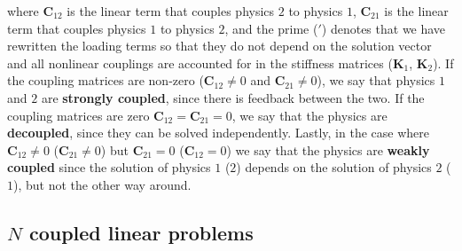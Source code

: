     where $\mathbf{C}_{12}$ is the linear term that couples physics $2$ to physics $1$,
$\mathbf{C}_{21}$ is the linear term that couples physics $1$ to physics $2$, and the
    prime ($\prime$) denotes that we have rewritten the loading terms so that they do not
    depend on the solution vector and all nonlinear couplings are
    accounted for in the stiffness matrices ($\mathbf{K}_1$, $\mathbf{K}_2$). If the coupling
    matrices are non-zero ($\mathbf{C}_{12}\neq 0$ and $\mathbf{C}_{21}\neq 0$), we
    say that physics $1$ and $2$ are
    \textbf{strongly coupled}, since there is feedback between the two. If the
    coupling matrices are zero $\mathbf{C}_{12}=\mathbf{C}_{21}=0$, we say that the
    physics
    are \textbf{decoupled}, since they can be solved independently. Lastly, in the
    case where $\mathbf{C}_{12}\neq 0$ ($\mathbf{C}_{21}\neq 0$) but $\mathbf{C}_{21} = 0$ ($\mathbf{C}_{12} = 0$) we say that the
    physics are \textbf{weakly
        coupled} since the solution of physics $1$ ($2$) depends on the solution of physics
$2$ ($1$), but not the other way around.

\subsection*{$N$ coupled linear problems}



